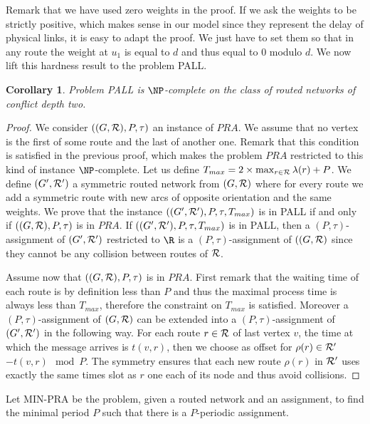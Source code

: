 \documentclass[a4paper,10pt]{article}
\newtheorem{corollary}{Corollary}
\begin{document}
 Remark that we have used zero weights in the proof. If we ask the weights to be strictly positive, which makes sense in our model since
they represent the delay of physical links, it is easy to adapt the proof. We just have to set them so that in any route the weight at $u_1$ is equal to $d$ and thus equal to $0$ modulo $d$. We now lift this hardness result to the problem PALL.

\begin{corollary}
Problem PALL is $\NP$-complete on the class of routed networks of conflict depth two.
\end{corollary}
\begin{proof}
 We consider $((G,{\cal R}),P,\tau)$ an instance of $PRA$. We assume that no vertex is the first of some route and the last of another one. Remark that this condition is satisfied in the previous proof, which makes the problem $PRA$ restricted to this kind of instance $\NP$-complete. 
 Let us define $T_{max} = 2 \times \max_{r \in {\cal R}} \lambda(r) + P$. We define $(G',{\cal R}')$ a symmetric routed network from $(G,{\cal R})$ where for every route we add a symmetric route with new arcs of opposite orientation and the same weights.
 We prove that the instance $((G',{\cal R'}),P,\tau,T_{max})$ is in PALL if and only if $((G,{\cal R}),P,\tau)$ is in $PRA$.
 If $((G',{\cal R'}),P,\tau,T_{max})$ is in PALL, then a $(P,\tau)$-assignment of $(G',{\cal R'})$ restricted to $\R$ is a $(P,\tau)$-assignment of $((G,{\cal R})$ since they cannot be any collision between routes of ${\cal R}$.
 
 Assume now that $((G,{\cal R}),P,\tau)$ is in $PRA$. First remark that the waiting time of each route is by definition less than $P$ and thus the maximal process time is always less than $T_{max}$, therefore the constraint on $T_{max}$ is satisfied. Moreover a $(P,\tau)$-assignment of $(G,{\cal R})$ can be extended into a $(P,\tau)$-assignment of $(G',{\cal R'})$ in the following way. For each route $r \in \cal{R}$ of last vertex $v$, the time at which the message arrives is $t(v,r)$, then we choose as offset for $\rho(r) \in \cal{R}'$ $-t(v,r) \mod P$. The symmetry ensures that each new route $\rho(r)$ in ${\cal R'}$ uses exactly the same times slot as $r$ one each of its node and thus avoid collisions.
\end{proof}

Let MIN-PRA be the problem, given a routed network and an assignment, to find the minimal period $P$ such that there is a $P$-periodic assignment. 
\end{document}
